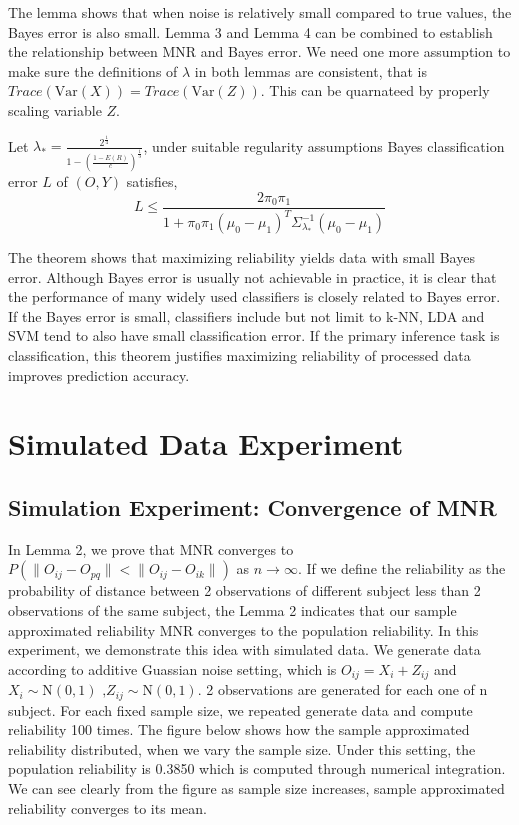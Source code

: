 \documentclass{article}
\begin{document}
The lemma shows that when noise is relatively small compared to true values, the Bayes error is also small. Lemma 3 and Lemma 4 can be combined to establish the relationship between MNR and Bayes error. We need one more assumption to make sure the definitions of $\lambda$ in both lemmas are consistent, that is $Trace(\text{Var}(X))=Trace(\text{Var}(Z))$. This can be quarnateed by properly scaling variable $Z$.
\begin{thm}
Let $\lambda_{\ast}=\frac{2^{\frac{1}{4}}}{1-(\frac{1-E(R)}{c})^{\frac{1}{3}}}$, under suitable regularity assumptions Bayes classification error $L$ of $(O,Y)$ satisfies,
\[ L \leq \frac{2\pi_0\pi_1}{1+\pi_0\pi_1(\mu_0-\mu_1)^T\Sigma_{\lambda_\ast}^{-1}(\mu_0-\mu_1)}\]
\end{thm} 
\noindent The theorem shows that maximizing reliability yields data with small Bayes error. Although Bayes error is usually not achievable in practice, it is clear that the performance of many widely used classifiers is closely related to Bayes error. If the Bayes error is small, classifiers include but not limit to k-NN, LDA and SVM tend to also have small classification error. If the primary inference task is classification, this theorem justifies maximizing reliability of processed data improves prediction accuracy.

\section{Simulated Data Experiment}


\subsection{Simulation Experiment: Convergence of MNR}
\noindent In Lemma 2, we prove that MNR converges to $P(\|O_{ij}-O_{pq}\| < \|O_{ij}-O_{ik}\|)$ as $n\rightarrow\infty$. If we define the reliability as the probability of distance between 2 observations of different subject less than 2 observations of the same subject, the Lemma 2 indicates that our sample approximated reliability MNR converges to the population reliability. In this experiment, we demonstrate this idea with simulated data. We generate data according to additive Guassian noise setting, which is $O_{ij}=X_i+Z_{ij}$ and $X_i \sim \text{N}(0,1) \text{ ,}Z_{ij} \sim \text{N}(0,1)$. 2 observations are generated for each one of n subject. For each fixed sample size, we repeated generate data and compute reliability 100 times. The figure below shows how the sample approximated reliability distributed, when we vary the sample size. Under this setting, the population reliability is 0.3850 which is computed through numerical integration. We can see clearly from the figure as sample size increases, sample approximated reliability converges to its mean.
\end{document}
